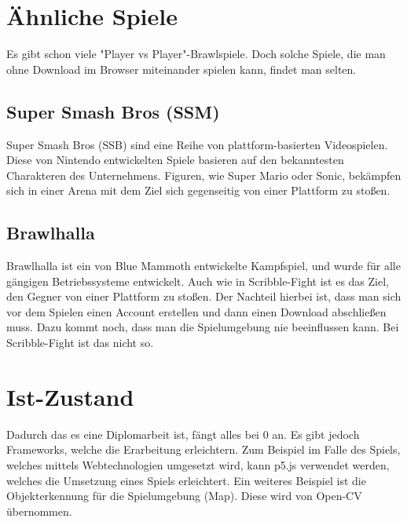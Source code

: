 \section{Ähnliche Spiele}
Es gibt schon viele "Player vs Player"-Brawlspiele. Doch solche Spiele, die man ohne Download im Browser
miteinander spielen kann, findet man selten. 

\subsection{Super Smash Bros (SSM)}
Super Smash Bros (SSB) sind eine Reihe von plattform-basierten Videospielen.
Diese von Nintendo entwickelten Spiele basieren auf den bekanntesten Charakteren des Unternehmens.
Figuren, wie Super Mario oder Sonic, bekämpfen sich in einer Arena mit dem Ziel sich gegenseitig 
von einer Plattform zu stoßen.

\subsection{Brawlhalla}
Brawlhalla ist ein von Blue Mammoth entwickelte Kampfspiel, und wurde für alle gängigen Betriebssysteme entwickelt. 
Auch wie in Scribble-Fight ist es das Ziel, den Gegner von einer Plattform zu stoßen.
Der Nachteil hierbei ist, dass man sich vor dem Spielen einen Account erstellen
und dann einen Download abschließen muss. Dazu kommt noch, dass man die Spielumgebung nie beeinflussen kann.
Bei Scribble-Fight ist das nicht so. 


\section{Ist-Zustand}
Dadurch das es eine Diplomarbeit ist, fängt alles bei 0 an. Es gibt jedoch Frameworks,
welche die Erarbeitung erleichtern. Zum Beispiel im Falle des Spiels, welches
mittels Webtechnologien umgesetzt wird, kann p5.js verwendet werden, welches die
Umsetzung eines Spiels erleichtert. Ein weiteres Beispiel ist die Objekterkennung für
die Spielumgebung (Map). Diese wird von Open-CV übernommen.